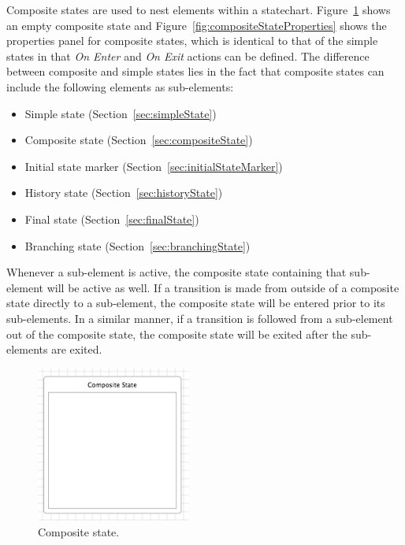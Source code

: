 \documentclass[11pt]{amsart}
\begin{document}
Composite states are used to nest elements within a statechart. Figure~\ref{fig:compositeState} shows an empty composite state and Figure~\ref{fig:compositeStateProperties} shows the properties panel for composite states, which is identical to that of the simple states in that \emph{On Enter} and \emph{On Exit} actions can be defined. The difference between composite and simple states lies in the fact that composite states can include the following elements as sub-elements:
\begin{itemize}
\item Simple state (Section~\ref{sec:simpleState})
\item Composite state (Section~\ref{sec:compositeState})
\item Initial state marker (Section~\ref{sec:initialStateMarker})
\item History state (Section~\ref{sec:historyState})
\item Final state (Section~\ref{sec:finalState})
\item Branching state (Section~\ref{sec:branchingState})
\end{itemize}
Whenever a sub-element is active, the composite state containing that sub-element will be active as well. If a transition is made from outside of a composite state directly to a sub-element, the composite state will be entered prior to its sub-elements. In a similar manner, if a transition is followed from a sub-element out of the composite state, the composite state will be exited after the sub-elements are exited.

\begin{figure}
\begin{center}
\vspace{.2in}
\centerline {
\includegraphics[width=2in]{StatechartsImages/CompositeState.png}
}
\caption{Composite state.}
\label{fig:compositeState}
\end{center}
\end{figure}
\end{document}
